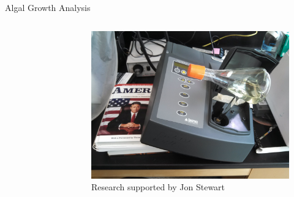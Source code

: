 \documentclass[8pt]{beamer}\usepackage[]{graphicx}\usepackage[]{color}
\begin{document}
\begin{frame}{Algal Growth Analysis}
\begin{columns}
\begin{figure}
                        \end{figure}
                        \begin{figure}
                                \includegraphics[width=1\textwidth]{./figure/AlgaeReadingSpec.jpg}
                                \caption{Research supported by Jon Stewart}
                        \end{figure}
        \end{columns}
\end{frame}
\end{document}
